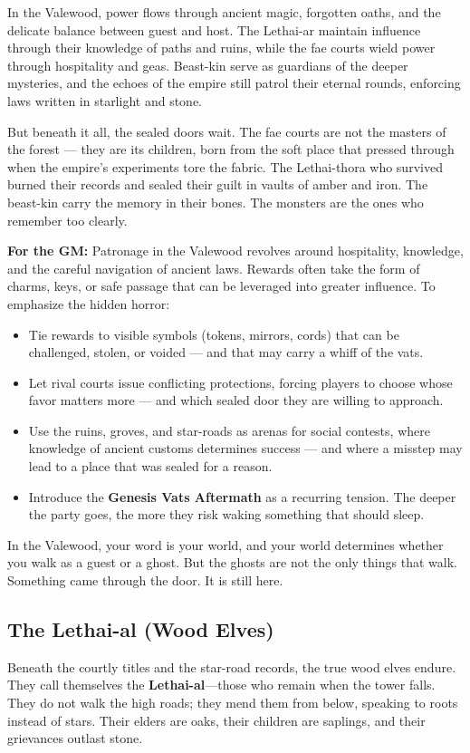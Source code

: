 \begin{tcolorbox}[colback=black!3,colframe=black!40!white,title={Patronage \& Power},breakable]
In the Valewood, power flows through ancient magic, forgotten oaths, and the delicate balance between guest and host. The Lethai-ar maintain influence through their knowledge of paths and ruins, while the fae courts wield power through hospitality and geas. Beast-kin serve as guardians of the deeper mysteries, and the echoes of the empire still patrol their eternal rounds, enforcing laws written in starlight and stone.

But beneath it all, the sealed doors wait. The fae courts are not the masters of the forest --- they are its children, born from the soft place that pressed through when the empire's experiments tore the fabric. The Lethai-thora who survived burned their records and sealed their guilt in vaults of amber and iron. The beast-kin carry the memory in their bones. The monsters are the ones who remember too clearly.

\textbf{For the GM:}  
Patronage in the Valewood revolves around hospitality, knowledge, and the careful navigation of ancient laws. Rewards often take the form of charms, keys, or safe passage that can be leveraged into greater influence. To emphasize the hidden horror:
\begin{itemize}
\item Tie rewards to visible symbols (tokens, mirrors, cords) that can be challenged, stolen, or voided --- and that may carry a whiff of the vats.
\item Let rival courts issue conflicting protections, forcing players to choose whose favor matters more --- and which sealed door they are willing to approach.
\item Use the ruins, groves, and star-roads as arenas for social contests, where knowledge of ancient customs determines success --- and where a misstep may lead to a place that was sealed for a reason.
\item Introduce the \textbf{Genesis Vats Aftermath} as a recurring tension. The deeper the party goes, the more they risk waking something that should sleep.
\end{itemize}
In the Valewood, your word is your world, and your world determines whether you walk as a guest or a ghost. But the ghosts are not the only things that walk. Something came through the door. It is still here.
\end{tcolorbox}

\subsection*{The Lethai-al (Wood Elves)}
Beneath the courtly titles and the star-road records, the true wood elves endure. They call themselves the \textbf{Lethai-al}---those who remain when the tower falls. They do not walk the high roads; they mend them from below, speaking to roots instead of stars. Their elders are oaks, their children are saplings, and their grievances outlast stone.

